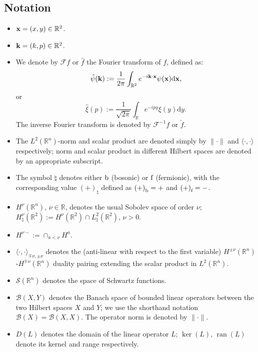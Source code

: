 \documentclass[a4paper,11pt,reqno]{amsart}
\theoremstyle{definition}
\numberwithin{equation}{section}
\newcommand{\ran}{\operatorname{ran }}
\newcommand{\RE}{\mathbb R}
\renewcommand{\SS}{\mathcal S}
\newcommand{\Fou}{\mathscr{F}}
\newcommand{\Bou}{\mathscr{B}}
\renewcommand{\d}{\mathrm{d}}
\newcommand{\x}{{\bf  x}}
\renewcommand{\k}{{\bf k}}
\newcommand{\bos}{\text{\rm b}}
\newcommand{\fer}{\text{\rm f}}
\newcommand{\bosfer}{{\natural}}
\newcommand{\bosferpm}{{(+)}}
\begin{document}




\subsection*{Notation}
\begin{itemize}
\item[-] $\x = (x,y) \in \RE^2$.
\item[-] $\k = (k,p) \in \RE^2$.
\item[-] We denote by $\Fou f$ or $\hat f $ the Fourier transform of $f$, defined as:
\[
\hat \psi (\k) := \frac{1}{2\pi} \int_{\RE^2} e^{- i\k \cdot\x} \psi(\x) \d\x ,
\]
or 
\[
\hat  \xi (p) := \frac{1}{\sqrt{2\pi}} \int_{\RE} e^{- ipy } \xi(y)  \d y.
\]
The inverse Fourier transform is denoted by   $\Fou^{-1} f$ or $\check f$. 
\item[-] The $L^2(\RE^n)$-norm and scalar product are denoted simply by $\|\cdot\|$ and  $\langle\cdot,\cdot\rangle$ respectively; norm and scalar product in different Hilbert spaces are denoted by an appropriate  subscript.
\item[-] The symbol $\bosfer$ denotes either $\bos$ (bosonic) or $\fer$ (fermionic), with the corresponding value $\bosferpm_\bosfer$ defined as $\bosferpm_\bos = +$ and $\bosferpm_\fer = -$.
\item[-] $H^\nu(\RE^n)$,  $\nu\in\RE $, denotes the usual Sobolev space of order $\nu$;
$H^\nu_{\bosfer}(\RE^2) := H^\nu(\RE^2) \cap L^2_{\bosfer}( \RE^2)$, $\nu>0$.
\item[-] $H^{\nu-}:=\cap_{a <\nu}H^{a}$.
\item[-] $\langle\cdot,\cdot\rangle_{\mp\nu,\pm\nu}$ denotes the (anti-linear with respect to the first variable) $H^{\pm\nu}(\RE^{n})$-$H^{\mp\nu}(\RE^{n})$ duality pairing extending the  scalar product in $L^{2}(\RE^{n})$.
\item[-]  $\SS(\RE^{n})$ denotes the space of Schwartz functions.
\item[-] $\Bou(X,Y)$ denotes the Banach space of bounded linear operators between the two Hilbert spaces $X$ and $Y$; we use the shorthand notation $\Bou(X) = \Bou(X,X)$. The operator norm is denoted by $\|\cdot\|$.
\item[-] $D(L)$ denotes the domain of the linear operator $L$; $\ker(L)$, $\ran(L)$ denote its kernel and range respectively.

\end{itemize}
\end{document}
